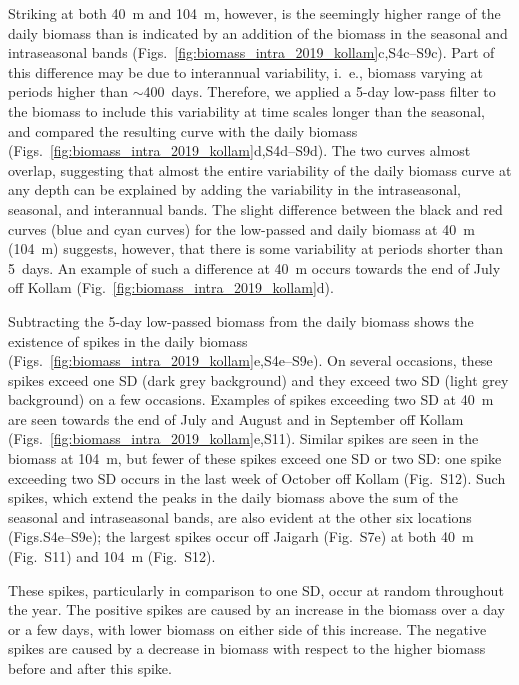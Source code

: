 \documentclass[authoryear,review,11pt]{elsarticle}
\begin{document}
Striking at both 40~m and 104~m, however, is the seemingly higher range of the daily biomass than is indicated by an addition of the biomass in the seasonal and intraseasonal bands (Figs.~\ref{fig:biomass_intra_2019_kollam}c,S4c--S9c). Part of this difference may be due to interannual variability, i.~e., biomass varying at periods higher than $\sim$400~days.  Therefore, we applied a 5-day low-pass filter to the biomass to include this variability at time scales longer than the seasonal, and compared the resulting curve with the daily biomass (Figs.~\ref{fig:biomass_intra_2019_kollam}d,S4d--S9d).  The two curves almost overlap, suggesting that almost the entire variability of the daily biomass curve at any depth can be explained by adding the variability in the intraseasonal, seasonal, and interannual bands. The slight difference between the black and red curves (blue and cyan curves) for the low-passed and daily biomass at 40~m (104~m) suggests, however, that there is some variability at periods shorter than 5~days.  An example of such a difference at 40~m occurs towards the end of July off Kollam (Fig.~\ref{fig:biomass_intra_2019_kollam}d).

Subtracting the 5-day low-passed biomass from the daily biomass shows the existence of spikes in the daily biomass (Figs.~\ref{fig:biomass_intra_2019_kollam}e,S4e--S9e).  On several occasions, these spikes exceed one SD (dark grey background) and they exceed two SD (light grey background) on a few occasions.  Examples of spikes exceeding two SD at 40~m are seen towards the end of July and August and in September off Kollam (Figs.~\ref{fig:biomass_intra_2019_kollam}e,S11). Similar spikes are seen in the biomass at 104~m, but fewer of these spikes exceed one SD or two SD: one spike exceeding two SD occurs in the last week of October off Kollam (Fig.~S12). Such spikes, which extend the peaks in the daily biomass above the sum of the seasonal and intraseasonal bands, are also evident at the other six locations (Figs.S4e--S9e); the largest spikes occur off Jaigarh (Fig.~S7e) at both 40~m (Fig.~S11) and 104~m (Fig.~S12).  

These spikes, particularly in comparison to one SD, occur at random throughout the year. The positive spikes are caused by an increase in the biomass over a day or a few days, with lower biomass on either side of this increase. The negative spikes are caused by a decrease in biomass with respect to the higher biomass before and after this spike.

\end{document}
